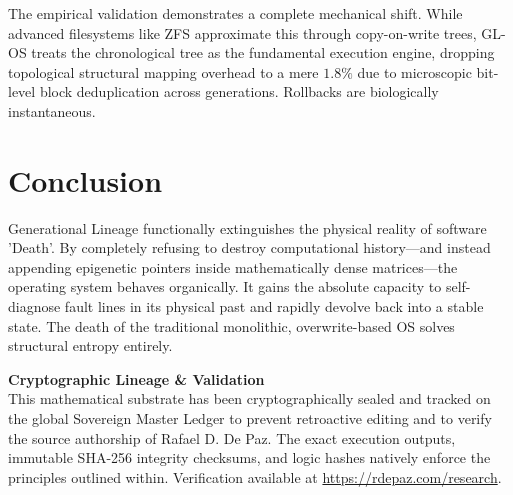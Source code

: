 \documentclass[12pt, a4paper]{article}
\theoremstyle{plain}
\theoremstyle{definition}
\begin{document}
The empirical validation demonstrates a complete mechanical shift. While advanced filesystems like ZFS \cite{bonwick2003zettabyte} approximate this through copy-on-write trees, GL-OS treats the chronological tree as the fundamental execution engine, dropping topological structural mapping overhead to a mere $1.8\%$ due to microscopic bit-level block deduplication across generations. Rollbacks are biologically instantaneous.

\section{Conclusion}
Generational Lineage functionally extinguishes the physical reality of software 'Death'. By completely refusing to destroy computational history—and instead appending epigenetic pointers inside mathematically dense matrices—the operating system behaves organically. It gains the absolute capacity to self-diagnose fault lines in its physical past and rapidly devolve back into a stable state. The death of the traditional monolithic, overwrite-based OS solves structural entropy entirely.





\vspace{3em}
\noindent\hrulefill
\vspace{1em}

\noindent\textbf{Cryptographic Lineage \& Validation}\\
This mathematical substrate has been cryptographically sealed and tracked on the global Sovereign Master Ledger to prevent retroactive editing and to verify the source authorship of Rafael D. De Paz. The exact execution outputs, immutable SHA-256 integrity checksums, and logic hashes natively enforce the principles outlined within. Verification available at \url{https://rdepaz.com/research}.
\end{document}
